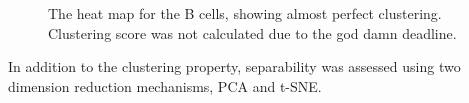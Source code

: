 \documentclass[3p,authoryear,preprint,12pt]{elsarticle}
\makeatletter
\def\fixFloatSize#1{}%
\makeatother
\begin{document}
\egroup
\bgroup
\fixFloatSize{img/BHeatmap.png}
\begin{figure}[!htbp]
	\centering \makeatletter{}
	\makeatother 
	\caption{{The heat map for the B cells, showing almost perfect clustering. Clustering score was not calculated due to the god damn deadline.}}
	\label{f-c2b15a1bacd9}
\end{figure}
\egroup

In addition to the clustering property, separability was assessed using two dimension reduction mechanisms, PCA and t-SNE.
\end{document}
